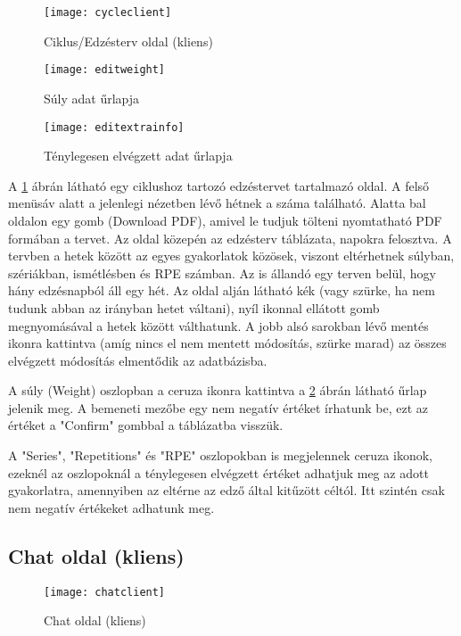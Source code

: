 \begin{figure}[H]
	\centering
	\texttt{[image: cycleclient]}
	\caption{Ciklus/Edzésterv oldal (kliens)}
	\label{fig:cycleclient}
\end{figure}

\begin{figure}[H]
	\centering
	\texttt{[image: editweight]}
	\caption{Súly adat űrlapja}
	\label{fig:editweight}
\end{figure}

\begin{figure}[H]
	\centering
	\texttt{[image: editextrainfo]}
	\caption{Ténylegesen elvégzett adat űrlapja}
	\label{fig:editextrainfo}
\end{figure}

A \ref{fig:cycleclient} ábrán látható egy ciklushoz tartozó edzéstervet tartalmazó oldal. A felső menüsáv alatt a jelenlegi nézetben lévő hétnek a száma található. Alatta bal oldalon egy gomb (Download PDF), amivel le tudjuk tölteni nyomtatható PDF formában a tervet. Az oldal közepén az edzésterv táblázata, napokra felosztva. A tervben a hetek között az egyes gyakorlatok közösek, viszont eltérhetnek súlyban, szériákban, ismétlésben és RPE számban. Az is állandó egy terven belül, hogy hány edzésnapból áll egy hét. Az oldal alján látható kék (vagy szürke, ha nem tudunk abban az irányban hetet váltani), nyíl ikonnal ellátott gomb megnyomásával a hetek között válthatunk. A jobb alsó sarokban lévő mentés ikonra kattintva (amíg nincs el nem mentett módosítás, szürke marad) az összes elvégzett módosítás elmentődik az adatbázisba.

A súly (Weight) oszlopban a ceruza ikonra kattintva a \ref{fig:editweight} ábrán látható űrlap jelenik meg. A bemeneti mezőbe egy nem negatív értéket írhatunk be, ezt az értéket a "Confirm" gombbal a táblázatba visszük.

A "Series", "Repetitions" és "RPE" oszlopokban is megjelennek ceruza ikonok, ezeknél az oszlopoknál a ténylegesen elvégzett értéket adhatjuk meg az adott gyakorlatra, amennyiben az eltérne az edző által kitűzött céltól. Itt szintén csak nem negatív értékeket adhatunk meg.

\subsection{Chat oldal (kliens)}

\begin{figure}[H]
	\centering
	\texttt{[image: chatclient]}
	\caption{Chat oldal (kliens)}
	\label{fig:chatclient}
\end{figure}

